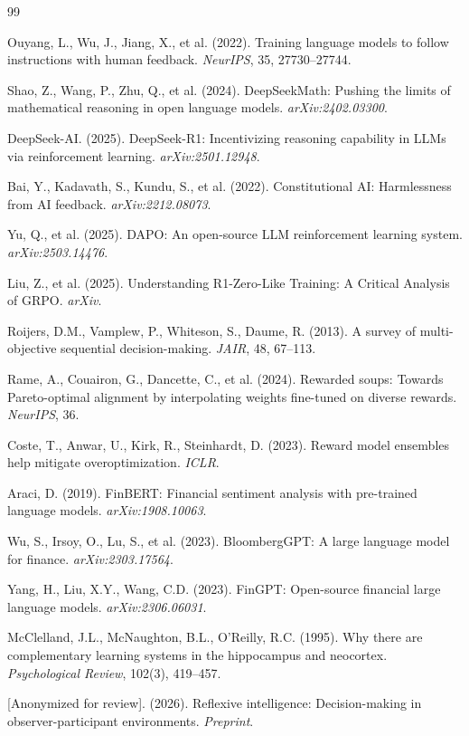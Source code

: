\documentclass[sigconf]{acmart}
\begin{document}
\begin{thebibliography}{99}

Ouyang, L., Wu, J., Jiang, X., et al. (2022).
Training language models to follow instructions with human feedback.
\textit{NeurIPS}, 35, 27730--27744.

Shao, Z., Wang, P., Zhu, Q., et al. (2024).
DeepSeekMath: Pushing the limits of mathematical reasoning in open language models.
\textit{arXiv:2402.03300}.

DeepSeek-AI. (2025).
DeepSeek-R1: Incentivizing reasoning capability in LLMs via reinforcement learning.
\textit{arXiv:2501.12948}.

Bai, Y., Kadavath, S., Kundu, S., et al. (2022).
Constitutional AI: Harmlessness from AI feedback.
\textit{arXiv:2212.08073}.

Yu, Q., et al. (2025).
DAPO: An open-source LLM reinforcement learning system.
\textit{arXiv:2503.14476}.

Liu, Z., et al. (2025).
Understanding R1-Zero-Like Training: A Critical Analysis of GRPO.
\textit{arXiv}.

Roijers, D.M., Vamplew, P., Whiteson, S., Daume, R. (2013).
A survey of multi-objective sequential decision-making.
\textit{JAIR}, 48, 67--113.

Rame, A., Couairon, G., Dancette, C., et al. (2024).
Rewarded soups: Towards Pareto-optimal alignment by interpolating weights fine-tuned on diverse rewards.
\textit{NeurIPS}, 36.

Coste, T., Anwar, U., Kirk, R., Steinhardt, D. (2023).
Reward model ensembles help mitigate overoptimization.
\textit{ICLR}.

Araci, D. (2019).
FinBERT: Financial sentiment analysis with pre-trained language models.
\textit{arXiv:1908.10063}.

Wu, S., Irsoy, O., Lu, S., et al. (2023).
BloombergGPT: A large language model for finance.
\textit{arXiv:2303.17564}.

Yang, H., Liu, X.Y., Wang, C.D. (2023).
FinGPT: Open-source financial large language models.
\textit{arXiv:2306.06031}.

McClelland, J.L., McNaughton, B.L., O'Reilly, R.C. (1995).
Why there are complementary learning systems in the hippocampus and neocortex.
\textit{Psychological Review}, 102(3), 419--457.

[Anonymized for review]. (2026).
Reflexive intelligence: Decision-making in observer-participant environments.
\textit{Preprint}.

\end{thebibliography}
\end{document}
